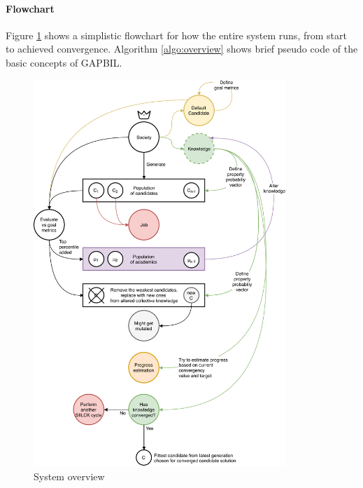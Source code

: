\documentclass[a4paper,english]{report}
\begin{document}
			\paragraph{Flowchart}
			Figure \ref{fig:sys_overview} shows a simplistic flowchart for how the entire system runs, from start to achieved convergence. Algorithm \ref{algo:overview} shows brief pseudo code of the basic concepts of GAPBIL.
			\begin{figure}[H]
				\centering
				\includegraphics[width=270pt]{overview}
				\caption{System overview}
				\label{fig:sys_overview}
			\end{figure}
			\clearpage
\end{document}
